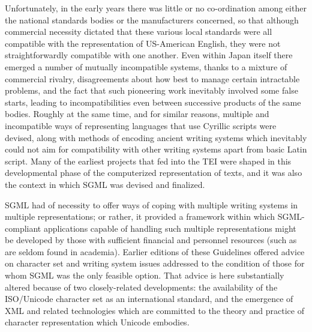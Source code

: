 Unfortunately, in the early years there was little or no co-ordination among either the national standards bodies or the manufacturers concerned, so that although commercial necessity dictated that these various local standards were all compatible with the representation of US-American English, they were not straightforwardly compatible with one another. Even within Japan itself there emerged a number of mutually incompatible systems, thanks to a mixture of commercial rivalry, disagreements about how best to manage certain intractable problems, and the fact that such pioneering work inevitably involved some false starts, leading to incompatibilities even between successive products of the same bodies. Roughly at the same time, and for similar reasons, multiple and incompatible ways of representing languages that use Cyrillic scripts were devised, along with methods of encoding ancient writing systems which inevitably could not aim for compatibility with other writing systems apart from basic Latin script. Many of the earliest projects that fed into the TEI were shaped in this developmental phase of the computerized representation of texts, and it was also the context in which SGML was devised and finalized. \par
SGML had of necessity to offer ways of coping with multiple writing systems in multiple representations; or rather, it provided a framework within which SGML-compliant applications capable of handling such multiple representations might be developed by those with sufficient financial and personnel resources (such as are seldom found in academia). Earlier editions of these Guidelines offered advice on character set and writing system issues addressed to the condition of those for whom SGML was the only feasible option. That advice is here substantially altered because of two closely-related developments: the availability of the ISO/Unicode character set as an international standard, and the emergence of XML and related technologies which are committed to the theory and practice of character representation which Unicode embodies. 
